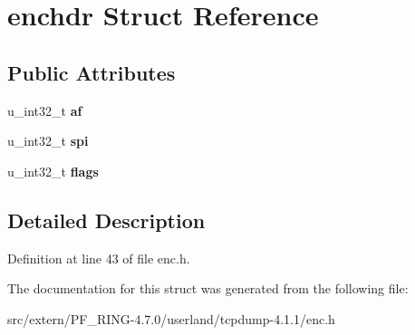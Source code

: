 \hypertarget{structenchdr}{
\section{enchdr Struct Reference}
\label{structenchdr}
}
\subsection*{Public Attributes}
\begin{DoxyCompactItemize}
\item 
\hypertarget{structenchdr_a56ea5cbcf1bac7a6d19abaa57abee879}{
u\_\-int32\_\-t {\bfseries af}}
\label{structenchdr_a56ea5cbcf1bac7a6d19abaa57abee879}

\item 
\hypertarget{structenchdr_a2fef877635932662f81c9e139e581d1b}{
u\_\-int32\_\-t {\bfseries spi}}
\label{structenchdr_a2fef877635932662f81c9e139e581d1b}

\item 
\hypertarget{structenchdr_a4f01a41e7926726af33ef8343dbffbba}{
u\_\-int32\_\-t {\bfseries flags}}
\label{structenchdr_a4f01a41e7926726af33ef8343dbffbba}

\end{DoxyCompactItemize}


\subsection{Detailed Description}


Definition at line 43 of file enc.h.



The documentation for this struct was generated from the following file:\begin{DoxyCompactItemize}
\item 
src/extern/PF\_\-RING-\/4.7.0/userland/tcpdump-\/4.1.1/enc.h\end{DoxyCompactItemize}
